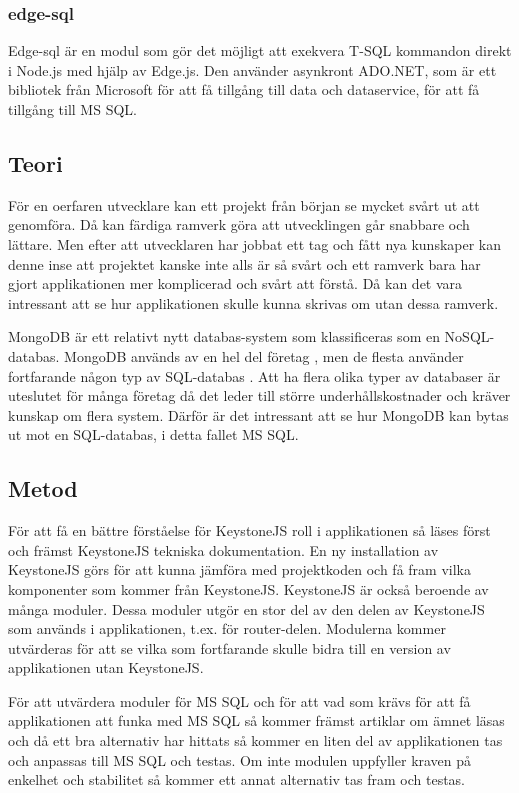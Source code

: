 \subsubsection{edge-sql}
Edge-sql är en modul som gör det möjligt att exekvera T-SQL kommandon direkt i Node.js med hjälp av Edge.js. Den använder asynkront ADO.NET, som är ett bibliotek från Microsoft för att få tillgång till data och dataservice, för att få tillgång till MS SQL. 

\subsection{Teori}
För en oerfaren utvecklare kan ett projekt från början se mycket svårt ut att genomföra. Då kan färdiga ramverk göra att utvecklingen går snabbare och lättare. Men efter att utvecklaren har jobbat ett tag och fått nya kunskaper kan denne inse att projektet kanske inte alls är så svårt och ett ramverk bara har gjort applikationen mer komplicerad och svårt att förstå. Då kan det vara intressant att se hur applikationen skulle kunna skrivas om utan dessa ramverk. 

MongoDB är ett relativt nytt databas-system som klassificeras som en NoSQL-databas. MongoDB används av en hel del företag \cite{mongoComp}, men de flesta använder fortfarande någon typ av SQL-databas \cite{databaseStats}. Att ha flera olika typer av databaser är uteslutet för många företag då det leder till större underhållskostnader och kräver kunskap om flera system. Därför är det intressant att se hur MongoDB kan bytas ut mot en SQL-databas, i detta fallet MS SQL.


\subsection{Metod}
För att få en bättre förståelse för KeystoneJS roll i applikationen så läses först och främst KeystoneJS tekniska dokumentation. En ny installation av KeystoneJS görs för att kunna jämföra med projektkoden och få fram vilka komponenter som kommer från KeystoneJS. KeystoneJS är också beroende av många moduler. Dessa moduler utgör en stor del av den delen av KeystoneJS som används i applikationen, t.ex. för router-delen. Modulerna kommer utvärderas för att se vilka som fortfarande skulle bidra till en version av applikationen utan KeystoneJS. 

För att utvärdera moduler för MS SQL och för att vad som krävs för att få applikationen att funka med MS SQL så kommer främst artiklar om ämnet läsas och då ett bra alternativ har hittats så kommer en liten del av applikationen tas och anpassas till MS SQL och testas. Om inte modulen uppfyller kraven på enkelhet och stabilitet så kommer ett annat alternativ tas fram och testas.

